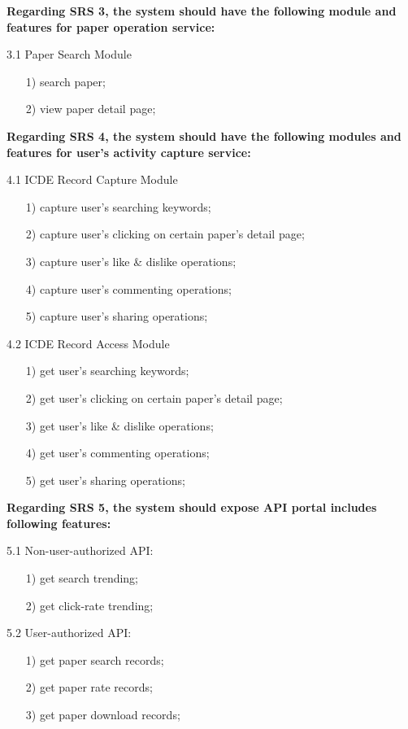 \documentclass[sigconf, nonacm]{../tex_template/acmart}
\begin{document}
\textbf{Regarding SRS 3, the system should have the following module and features for paper operation service:}

3.1 Paper Search Module
\begin{itemize}
	\item [1)]
	      search paper;
	\item [2)]
	      view paper detail page;
\end{itemize}

\textbf{Regarding SRS 4, the system should have the following modules and features for user's activity capture service:}

4.1 ICDE Record Capture Module
\begin{itemize}
	\item [1)]
	      capture user's searching keywords;
	\item [2)]
	      capture user's clicking on certain paper's detail page;
	\item [3)]
	      capture user's like \& dislike operations;
	\item [4)]
	      capture user's commenting operations;
	\item [5)]
	      capture user's sharing operations;
\end{itemize}

4.2 ICDE Record Access Module
\begin{itemize}
	\item [1)]
	      get user's searching keywords;
	\item [2)]
	      get user's clicking on certain paper's detail page;
	\item [3)]
	      get user's like \& dislike operations;
	\item [4)]
	      get user's commenting operations;
	\item [5)]
	      get user's sharing operations;
\end{itemize}

\textbf{Regarding SRS 5, the system should expose API portal includes following features:}

5.1 Non-user-authorized API:
\begin{itemize}
	\item [1)]
	      get search trending;
	\item [2)]
	      get click-rate trending;
\end{itemize}

5.2 User-authorized API:
\begin{itemize}
	\item [1)]
	      get paper search records;
	\item [2)]
	      get paper rate records;
	\item [3)]
	      get paper download records;
\end{itemize}
\end{document}
